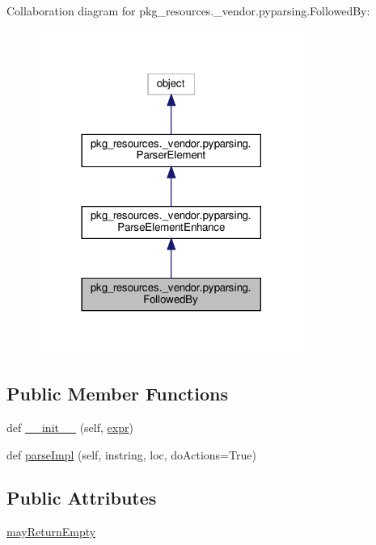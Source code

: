 Collaboration diagram for pkg\+\_\+resources.\+\_\+vendor.\+pyparsing.\+Followed\+By\+:
\nopagebreak
\begin{figure}[H]
\begin{center}
\leavevmode
\includegraphics[width=246pt]{classpkg__resources_1_1__vendor_1_1pyparsing_1_1FollowedBy__coll__graph}
\end{center}
\end{figure}
\subsection*{Public Member Functions}
\begin{DoxyCompactItemize}
\item 
def \hyperlink{classpkg__resources_1_1__vendor_1_1pyparsing_1_1FollowedBy_a53882c8e865062317a4af097f0d8aad6}{\+\_\+\+\_\+init\+\_\+\+\_\+} (self, \hyperlink{classpkg__resources_1_1__vendor_1_1pyparsing_1_1ParseElementEnhance_a34e02b3404b2a545ca1be8b522758896}{expr})
\item 
def \hyperlink{classpkg__resources_1_1__vendor_1_1pyparsing_1_1FollowedBy_a7d1cff50ee7bef3e95bf560539815130}{parse\+Impl} (self, instring, loc, do\+Actions=True)
\end{DoxyCompactItemize}
\subsection*{Public Attributes}
\begin{DoxyCompactItemize}
\item 
\hyperlink{classpkg__resources_1_1__vendor_1_1pyparsing_1_1FollowedBy_ac74195f91b3cfc49816f452733e22711}{may\+Return\+Empty}
\end{DoxyCompactItemize}
